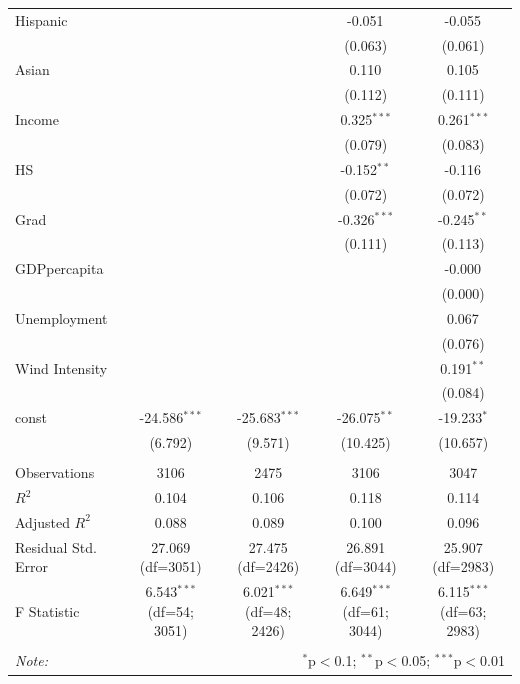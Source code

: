 \begin{table}[!htbp]
\begin{tabular}{@{\extracolsep{5pt}}lcccc}
 Hispanic & & & -0.051$^{}$ & -0.055$^{}$ \\
& & & (0.063) & (0.061) \\
 Asian & & & 0.110$^{}$ & 0.105$^{}$ \\
& & & (0.112) & (0.111) \\
 Income & & & 0.325$^{***}$ & 0.261$^{***}$ \\
& & & (0.079) & (0.083) \\
 HS & & & -0.152$^{**}$ & -0.116$^{}$ \\
& & & (0.072) & (0.072) \\
 Grad & & & -0.326$^{***}$ & -0.245$^{**}$ \\
& & & (0.111) & (0.113) \\
 GDPpercapita & & & & -0.000$^{}$ \\
& & & & (0.000) \\
 Unemployment & & & & 0.067$^{}$ \\
& & & & (0.076) \\
 Wind Intensity & & & & 0.191$^{**}$ \\
& & & & (0.084) \\
 const & -24.586$^{***}$ & -25.683$^{***}$ & -26.075$^{**}$ & -19.233$^{*}$ \\
& (6.792) & (9.571) & (10.425) & (10.657) \\
\hline \\[-1.8ex]
 Observations & 3106 & 2475 & 3106 & 3047 \\
 $R^2$ & 0.104 & 0.106 & 0.118 & 0.114 \\
 Adjusted $R^2$ & 0.088 & 0.089 & 0.100 & 0.096 \\
 Residual Std. Error & 27.069 (df=3051) & 27.475 (df=2426) & 26.891 (df=3044) & 25.907 (df=2983) \\
 F Statistic & 6.543$^{***}$ (df=54; 3051) & 6.021$^{***}$ (df=48; 2426) & 6.649$^{***}$ (df=61; 3044) & 6.115$^{***}$ (df=63; 2983) \\
\hline
\hline \\[-1.8ex]
\textit{Note:} & \multicolumn{4}{r}{$^{*}$p$<$0.1; $^{**}$p$<$0.05; $^{***}$p$<$0.01} \\
\end{tabular}
\end{table}